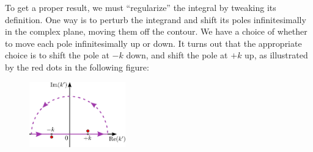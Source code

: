 \documentclass[pra,12pt]{revtex4-2}
\begin{document}
To get a proper result, we must ``regularize'' the integral by
tweaking its definition.  One way is to perturb the integrand and
shift its poles infinitesimally in the complex plane, moving them off
the contour.  We have a choice of whether to move each pole
infinitesimally up or down.  It turns out that the appropriate choice
is to shift the pole at $-k$ down, and shift the pole at $+k$ up, as
illustrated by the red dots in the following figure:

\begin{figure}[h!]
  \centering\includegraphics[width=0.37\textwidth]{greencontour}
\end{figure}
\end{document}
